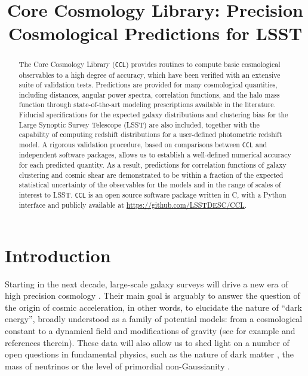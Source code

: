\documentclass[\docopts]{\docclass}
\newcommand{\ccl}{{\tt CCL}\xspace}
\begin{document}
\title{Core Cosmology Library: Precision Cosmological Predictions for LSST}

\maketitlepre

\begin{abstract}

The Core Cosmology Library (\ccl) provides routines to compute basic cosmological observables to a high degree of accuracy, which have been verified with an extensive suite of validation tests. Predictions are provided for many cosmological quantities, including distances, angular power spectra, correlation functions, and the halo mass function through state-of-the-art modeling prescriptions available in the literature. Fiducial specifications for the expected galaxy distributions and clustering bias for the Large Synoptic Survey Telescope (LSST) are also included, together with the capability of computing redshift distributions for a user-defined photometric redshift model. A rigorous validation procedure, based on comparisons between \ccl and independent software packages, allows us to establish a well-defined numerical accuracy for each predicted quantity. As a result, predictions for correlation functions of galaxy clustering and cosmic shear are demonstrated to be within a fraction of the expected statistical uncertainty of the observables for the models and in the range of scales of interest to LSST. \ccl is an open source software package written in C, with a Python interface and publicly available at \url{https://github.com/LSSTDESC/CCL}. 

\end{abstract}

\maketitlepost



\section{Introduction}
\label{sec:intro}

Starting in the next decade, large-scale galaxy surveys will drive a new era of high precision cosmology \citep{DESCWhite,green11,Laureijs11}. Their main goal is arguably to answer the question of the origin of cosmic acceleration, in other words, to elucidate the nature of ``dark energy'', broadly understood as a family of potential models: from a cosmological constant to a dynamical field and modifications of gravity (see for example  \citealt{Carroll2001CC,Peebles2003,Padmanabhan2003,Copeland2006,Ishak2007,Weinberg13} and references therein). These data will also allow us to shed light on a number of open questions in fundamental physics, such as the nature of dark matter \citep{Feng10,Porter11}, the mass of neutrinos \citep{Wong11,Lesgourgues12,Allison15} or the level of primordial non-Gaussianity \citep{Dalal08,Desjacques10}.
\end{document}
